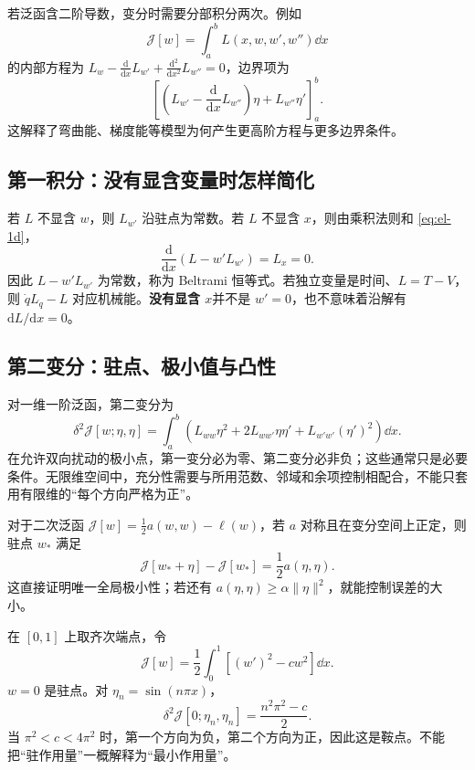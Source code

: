 若泛函含二阶导数，变分时需要分部积分两次。例如
\begin{equation}
 \mathcal J[w]=\int_a^b L(x,w,w',w'')\dd x
\end{equation}
的内部方程为 $L_w-\frac{\mathrm d}{\mathrm dx}L_{w'}+\frac{\mathrm d^2}{\mathrm dx^2}L_{w''}=0$，边界项为
\begin{equation}
 \left[\left(L_{w'}-\frac{\mathrm d}{\mathrm dx}L_{w''}\right)\eta
 +L_{w''}\eta'\right]_a^b.
\end{equation}
这解释了弯曲能、梯度能等模型为何产生更高阶方程与更多边界条件。

\subsection{第一积分：没有显含变量时怎样简化}

若 $L$ 不显含 $w$，则 $L_{w'}$ 沿驻点为常数。若 $L$ 不显含 $x$，则由乘积法则和 \eqref{eq:el-1d}，
\begin{equation}
 \frac{\mathrm d}{\mathrm dx}(L-w'L_{w'})=L_x=0.
\end{equation}
因此 $L-w'L_{w'}$ 为常数，称为 Beltrami 恒等式。若独立变量是时间、$L=T-V$，则 $\dot q L_{\dot q}-L$ 对应机械能。\textbf{没有显含 $x$}并不是 $w'=0$，也不意味着沿解有 $\mathrm dL/\mathrm dx=0$。

\subsection{第二变分：驻点、极小值与凸性}

对一维一阶泛函，第二变分为
\begin{equation}
 \delta^2\mathcal J[w;\eta,\eta]
 =\int_a^b\left(L_{ww}\eta^2
 +2L_{ww'}\eta\eta'+L_{w'w'}(\eta')^2\right)\dd x.
\end{equation}
在允许双向扰动的极小点，第一变分必为零、第二变分必非负；这些通常只是必要条件。无限维空间中，充分性需要与所用范数、邻域和余项控制相配合，不能只套用有限维的“每个方向严格为正”。

对于二次泛函 $\mathcal J[w]=\frac12a(w,w)-\ell(w)$，若 $a$ 对称且在变分空间上正定，则驻点 $w_*$ 满足
\begin{equation}
 \mathcal J[w_*+\eta]-\mathcal J[w_*]=\frac12a(\eta,\eta).
 \label{eq:quadratic-energy-gap}
\end{equation}
这直接证明唯一全局极小性；若还有 $a(\eta,\eta)\ge\alpha\|\eta\|^2$，就能控制误差的大小。

\begin{example}
在 $[0,1]$ 上取齐次端点，令
\begin{equation}
 \mathcal J[w]=\frac12\int_0^1[(w')^2-cw^2]\dd x.
\end{equation}
$w=0$ 是驻点。对 $\eta_n=\sin(n\pi x)$，
\begin{equation}
 \delta^2\mathcal J[0;\eta_n,\eta_n]
 =\frac{n^2\pi^2-c}{2}.
\end{equation}
当 $\pi^2<c<4\pi^2$ 时，第一个方向为负，第二个方向为正，因此这是鞍点。不能把“驻作用量”一概解释为“最小作用量”。
\end{example}

